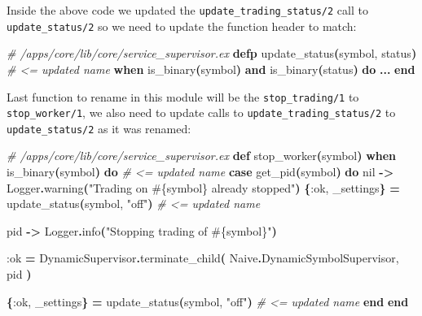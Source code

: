 \documentclass[
  oneside]{book}
\newenvironment{Shaded}{\begin{snugshade}}{\end{snugshade}}
\newcommand{\CommentTok}[1]{\textcolor[rgb]{0.56,0.35,0.01}{\textit{#1}}}
\newcommand{\ConstantTok}[1]{\textcolor[rgb]{0.56,0.35,0.01}{#1}}
\newcommand{\FunctionTok}[1]{\textcolor[rgb]{0.13,0.29,0.53}{\textbf{#1}}}
\newcommand{\KeywordTok}[1]{\textcolor[rgb]{0.13,0.29,0.53}{\textbf{#1}}}
\newcommand{\NormalTok}[1]{#1}
\newcommand{\OperatorTok}[1]{\textcolor[rgb]{0.81,0.36,0.00}{\textbf{#1}}}
\newcommand{\OtherTok}[1]{\textcolor[rgb]{0.56,0.35,0.01}{#1}}
\newcommand{\StringTok}[1]{\textcolor[rgb]{0.31,0.60,0.02}{#1}}
\newcommand{\VariableTok}[1]{\textcolor[rgb]{0.00,0.00,0.00}{#1}}
\begin{document}
Inside the above code we updated the \texttt{update\_trading\_status/2} call to \texttt{update\_status/2} so we need to update the function header to match:

\begin{Shaded}
\begin{Highlighting}[]
  \CommentTok{\# /apps/core/lib/core/service\_supervisor.ex}
  \KeywordTok{defp}\NormalTok{ update\_status}\FunctionTok{(}\NormalTok{symbol, status}\FunctionTok{)} \CommentTok{\# \textless{}= updated name}
      \KeywordTok{when}\NormalTok{ is\_binary}\FunctionTok{(}\NormalTok{symbol}\FunctionTok{)} \KeywordTok{and}\NormalTok{ is\_binary}\FunctionTok{(}\NormalTok{status}\FunctionTok{)} \KeywordTok{do}
     \OperatorTok{...}
  \KeywordTok{end}
\end{Highlighting}
\end{Shaded}

Last function to rename in this module will be the \texttt{stop\_trading/1} to \texttt{stop\_worker/1}, we also need to update calls to \texttt{update\_trading\_status/2} to \texttt{update\_status/2} as it was renamed:

\begin{Shaded}
\begin{Highlighting}[]
  \CommentTok{\# /apps/core/lib/core/service\_supervisor.ex}
  \KeywordTok{def}\NormalTok{ stop\_worker}\FunctionTok{(}\NormalTok{symbol}\FunctionTok{)} \KeywordTok{when}\NormalTok{ is\_binary}\FunctionTok{(}\NormalTok{symbol}\FunctionTok{)} \KeywordTok{do} \CommentTok{\# \textless{}= updated name}
    \KeywordTok{case}\NormalTok{ get\_pid}\FunctionTok{(}\NormalTok{symbol}\FunctionTok{)} \KeywordTok{do}
      \ConstantTok{nil} \OperatorTok{{-}\textgreater{}}
        \ConstantTok{Logger}\OperatorTok{.}\NormalTok{warning}\FunctionTok{(}\StringTok{"Trading on }\OtherTok{\#\{}\NormalTok{symbol}\OtherTok{\}}\StringTok{ already stopped"}\FunctionTok{)}
        \FunctionTok{\{}\VariableTok{:ok}\NormalTok{, \_settings}\FunctionTok{\}} \OperatorTok{=}\NormalTok{ update\_status}\FunctionTok{(}\NormalTok{symbol, }\StringTok{"off"}\FunctionTok{)} \CommentTok{\# \textless{}= updated name}

\NormalTok{      pid }\OperatorTok{{-}\textgreater{}}
        \ConstantTok{Logger}\OperatorTok{.}\NormalTok{info}\FunctionTok{(}\StringTok{"Stopping trading of }\OtherTok{\#\{}\NormalTok{symbol}\OtherTok{\}}\StringTok{"}\FunctionTok{)}

        \VariableTok{:ok} \OperatorTok{=}
          \ConstantTok{DynamicSupervisor}\OperatorTok{.}\NormalTok{terminate\_child}\FunctionTok{(}
            \ConstantTok{Naive}\OperatorTok{.}\ConstantTok{DynamicSymbolSupervisor}\NormalTok{,}
\NormalTok{            pid}
          \FunctionTok{)}

        \FunctionTok{\{}\VariableTok{:ok}\NormalTok{, \_settings}\FunctionTok{\}} \OperatorTok{=}\NormalTok{ update\_status}\FunctionTok{(}\NormalTok{symbol, }\StringTok{"off"}\FunctionTok{)} \CommentTok{\# \textless{}= updated name}
    \KeywordTok{end}
  \KeywordTok{end}
\end{Highlighting}
\end{Shaded}
\end{document}
